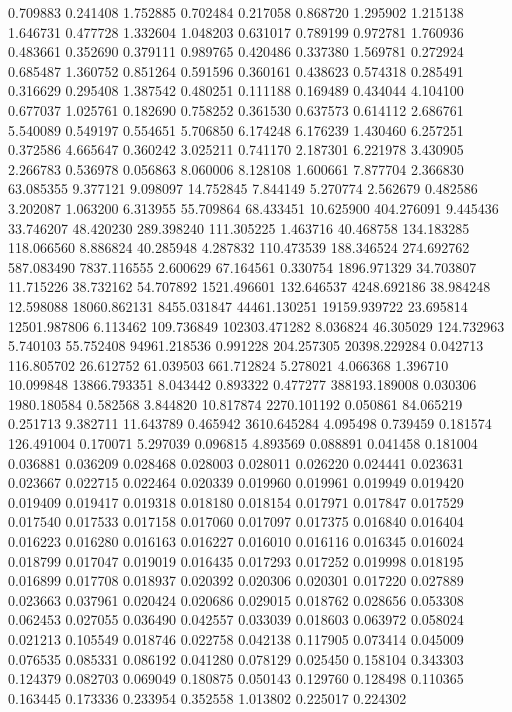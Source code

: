 0.709883
0.241408
1.752885
0.702484
0.217058
0.868720
1.295902
1.215138
1.646731
0.477728
1.332604
1.048203
0.631017
0.789199
0.972781
1.760936
0.483661
0.352690
0.379111
0.989765
0.420486
0.337380
1.569781
0.272924
0.685487
1.360752
0.851264
0.591596
0.360161
0.438623
0.574318
0.285491
0.316629
0.295408
1.387542
0.480251
0.111188
0.169489
0.434044
4.104100
0.677037
1.025761
0.182690
0.758252
0.361530
0.637573
0.614112
2.686761
5.540089
0.549197
0.554651
5.706850
6.174248
6.176239
1.430460
6.257251
0.372586
4.665647
0.360242
3.025211
0.741170
2.187301
6.221978
3.430905
2.266783
0.536978
0.056863
8.060006
8.128108
1.600661
7.877704
2.366830
63.085355
9.377121
9.098097
14.752845
7.844149
5.270774
2.562679
0.482586
3.202087
1.063200
6.313955
55.709864
68.433451
10.625900
404.276091
9.445436
33.746207
48.420230
289.398240
111.305225
1.463716
40.468758
134.183285
118.066560
8.886824
40.285948
4.287832
110.473539
188.346524
274.692762
587.083490
7837.116555
2.600629
67.164561
0.330754
1896.971329
34.703807
11.715226
38.732162
54.707892
1521.496601
132.646537
4248.692186
38.984248
12.598088
18060.862131
8455.031847
44461.130251
19159.939722
23.695814
12501.987806
6.113462
109.736849
102303.471282
8.036824
46.305029
124.732963
5.740103
55.752408
94961.218536
0.991228
204.257305
20398.229284
0.042713
116.805702
26.612752
61.039503
661.712824
5.278021
4.066368
1.396710
10.099848
13866.793351
8.043442
0.893322
0.477277
388193.189008
0.030306
1980.180584
0.582568
3.844820
10.817874
2270.101192
0.050861
84.065219
0.251713
9.382711
11.643789
0.465942
3610.645284
4.095498
0.739459
0.181574
126.491004
0.170071
5.297039
0.096815
4.893569
0.088891
0.041458
0.181004
0.036881
0.036209
0.028468
0.028003
0.028011
0.026220
0.024441
0.023631
0.023667
0.022715
0.022464
0.020339
0.019960
0.019961
0.019949
0.019420
0.019409
0.019417
0.019318
0.018180
0.018154
0.017971
0.017847
0.017529
0.017540
0.017533
0.017158
0.017060
0.017097
0.017375
0.016840
0.016404
0.016223
0.016280
0.016163
0.016227
0.016010
0.016116
0.016345
0.016024
0.018799
0.017047
0.019019
0.016435
0.017293
0.017252
0.019998
0.018195
0.016899
0.017708
0.018937
0.020392
0.020306
0.020301
0.017220
0.027889
0.023663
0.037961
0.020424
0.020686
0.029015
0.018762
0.028656
0.053308
0.062453
0.027055
0.036490
0.042557
0.033039
0.018603
0.063972
0.058024
0.021213
0.105549
0.018746
0.022758
0.042138
0.117905
0.073414
0.045009
0.076535
0.085331
0.086192
0.041280
0.078129
0.025450
0.158104
0.343303
0.124379
0.082703
0.069049
0.180875
0.050143
0.129760
0.128498
0.110365
0.163445
0.173336
0.233954
0.352558
1.013802
0.225017
0.224302
